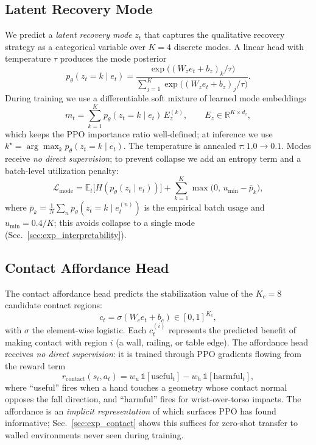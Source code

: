 \documentclass[conference,letterpaper]{IEEEtran}
\newcommand{\zt}{z_t}
\newcommand{\at}{a_t}
\newcommand{\ct}{c_t}
\begin{document}
\subsection{Latent Recovery Mode}
\label{sec:latent_mode}

We predict a \emph{latent recovery mode} $\zt$ that captures the qualitative recovery strategy as a categorical variable over $K=4$ discrete modes.
A linear head with temperature $\tau$ produces the mode posterior
\begin{equation}
    p_\theta(\zt{=}k\mid e_t) = \frac{\exp\!\big((W_z e_t + b_z)_k/\tau\big)}{\sum_{j=1}^K \exp\!\big((W_z e_t + b_z)_j/\tau\big)}.
\end{equation}
During training we use a differentiable soft mixture of learned mode embeddings
\begin{equation}
    m_t = \sum_{k=1}^K p_\theta(\zt{=}k\mid e_t)\,E_z^{(k)},\qquad E_z\in\mathbb{R}^{K\times d_z},
\end{equation}
which keeps the PPO importance ratio well-defined; at inference we use $k^\star=\arg\max_k p_\theta(\zt{=}k\mid e_t)$.
The temperature is annealed $\tau:1.0\to 0.1$.
Modes receive \emph{no direct supervision}; to prevent collapse we add an entropy term and a batch-level utilization penalty:
\begin{equation}
    \mathcal{L}_{\text{mode}} = \mathbb{E}_t\big[H(p_\theta(\zt\mid e_t))\big]
     + \sum_{k=1}^K\max\!\big(0,\, u_{\min}-\bar p_k\big),
    \label{eq:mode_loss}
\end{equation}
where $\bar p_k=\tfrac{1}{N}\sum_{n} p_\theta(\zt{=}k\mid e_t^{(n)})$ is the empirical batch usage and $u_{\min}=0.4/K$; this avoids collapse to a single mode (Sec.~\ref{sec:exp_interpretability}).

\subsection{Contact Affordance Head}
\label{sec:contact_affordance}

The contact affordance head predicts the stabilization value of the $K_c=8$ candidate contact regions:
\begin{equation}
    \ct = \sigma\!\left(W_c e_t + b_c\right) \in [0, 1]^{K_c},
\end{equation}
with $\sigma$ the element-wise logistic.
Each $c_t^{(i)}$ represents the predicted benefit of making contact with region $i$ (a wall, railing, or table edge).
The affordance head receives \emph{no direct supervision}: it is trained through PPO gradients flowing from the reward term
\begin{equation}
    r_{\mathrm{contact}}(s_t,\at) = w_u\,\mathbb{1}[\text{useful}_t] - w_h\,\mathbb{1}[\text{harmful}_t],
    \label{eq:r_contact}
\end{equation}
where ``useful'' fires when a hand touches a geometry whose contact normal opposes the fall direction, and ``harmful'' fires for wrist-over-torso impacts.
The affordance is an \emph{implicit representation} of which surfaces PPO has found informative; Sec.~\ref{sec:exp_contact} shows this suffices for zero-shot transfer to walled environments never seen during training.
\end{document}
